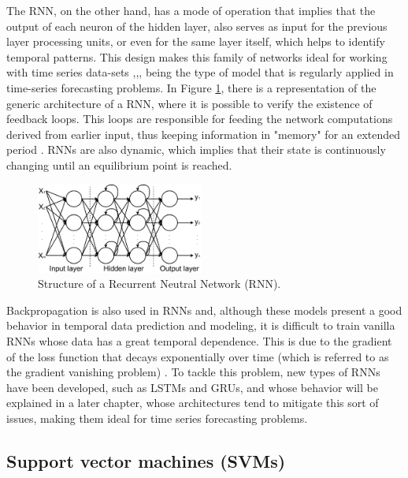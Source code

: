 The \ac{RNN}, on the other hand, has a mode of operation that implies that the output of each neuron of the hidden layer, also serves as input for the previous layer processing units, or even for the same layer itself, which helps to identify temporal patterns. This design makes this family of networks ideal for working with time series data-sets \cite{rnn1},\cite{rnn2},\cite{rnn3}, being the type of model that is regularly applied in time-series forecasting problems. In Figure \ref{rnn}, there is a representation of the generic architecture of a \ac{RNN}, where it is possible to verify the existence of feedback loops. This loops are responsible for feeding the network computations derived from earlier input, thus keeping information in "memory" for an extended period \cite{rnn4}. \ac{RNN}s are also dynamic, which implies that their state is continuously changing until an equilibrium point is reached. 

\begin{figure}[h!]
    \centering
    \begin{center}
    \includegraphics[width=0.49\textwidth]{Images/rnn.png}
    \caption{Structure of a Recurrent Neutral Network (RNN).}
    \label{rnn}
    \end{center}
\end{figure}



Backpropagation is also used in \ac{RNN}s and, although these models present a good behavior in temporal data prediction and modeling, it is difficult to train vanilla \ac{RNN}s whose data has a great temporal dependence. This is due to the gradient of the loss function that decays exponentially over time (which is referred to as the gradient vanishing problem) \cite{rnn4}. To tackle this problem, new types of \ac{RNN}s have been developed, such as \ac{LSTM}s and \ac{GRU}s, and whose behavior will be explained in a later chapter, whose architectures tend to mitigate this sort of issues, making them ideal for time series forecasting problems.

\subsection{Support vector machines (SVMs)}

